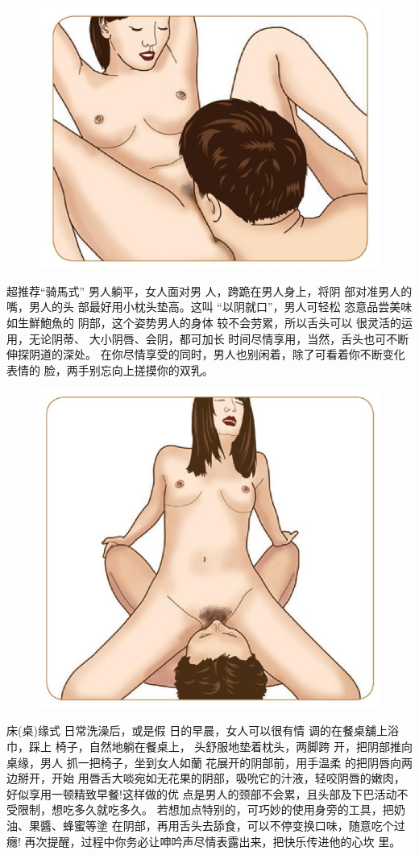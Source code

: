 \documentclass[12pt,UTF8]{ctexbook}
\begin{document}
\begin{figure}[htbp]
	\centering
	\includegraphics[width=0.7\linewidth]{21}
	\caption{}
	\label{fig:1}
\end{figure}

超推荐“骑馬式”
男人躺平，女人面对男
人，跨跪在男人身上，将阴
部对准男人的嘴，男人的头
部最好用小枕头垫高。这叫
“以阴就口”，男人可轻松
恣意品尝美味如生鮮鮑魚的
阴部，这个姿势男人的身体
较不会劳累，所以舌头可以
很灵活的运用，无论阴蒂、
大小阴唇、会阴，都可加长
时间尽情享用，当然，舌头也可不断伸探阴道的深处。
在你尽情享受的同时，男人也别闲着，除了可看着你不断变化表情的
脸，两手别忘向上搓摸你的双乳。

\begin{figure}[htbp]
	\centering
	\includegraphics[width=0.7\linewidth]{22}
	\caption{}
	\label{fig:1}
\end{figure}

床(桌)缘式
日常洗澡后，或是假
日的早晨，女人可以很有情
调的在餐桌舖上浴巾，踩上
椅子，自然地躺在餐桌上，
头舒服地垫着枕头，两脚跨
开，把阴部推向桌缘，男人
抓一把椅子，坐到女人如蘭
花展开的阴部前，用手温柔
的把阴唇向两边掰开，开始
用唇舌大啖宛如无花果的阴部，吸吮它的汁液，轻咬阴唇的嫩肉，好似享用一顿精致早餐!这样做的优
点是男人的颈部不会累，且头部及下巴活动不受限制，想吃多久就吃多久。
若想加点特别的，可巧妙的使用身旁的工具，把奶油、果醬、蜂蜜等塗
在阴部，再用舌头去舔食，可以不停变换口味，随意吃个过癮!
再次提醒，过程中你务必让呻吟声尽情表露出来，把快乐传进他的心坎
里。
\end{document}
